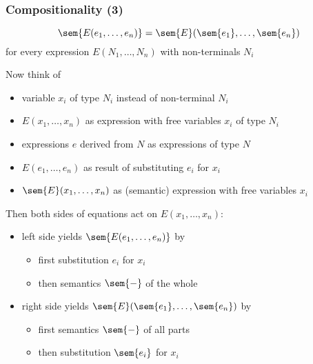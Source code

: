 \begin{frame}\frametitle{Compositionality (3)}
\[\sem{E(e_1,\ldots,e_n)}=\sem{E}(\sem{e_1},\ldots,\sem{e_n})\]
for every expression $E(N_1,\ldots,N_n)$ with non-terminals $N_i$
\bigskip

Now think of
\begin{itemize}
\item variable $x_i$ of type $N_i$ instead of non-terminal $N_i$
\item $E(x_1,\ldots,x_n)$ as expression with free variables $x_i$ of type $N_i$
\item expressions $e$ derived from $N$ as expressions of type $N$
\item $E(e_1,\ldots,e_n)$ as result of substituting $e_i$ for $x_i$
\item $\sem{E}(x_1,\ldots,x_n)$ as (semantic) expression with free variables $x_i$
\end{itemize}

Then both sides of equations act on $E(x_1,\ldots,x_n)$:
\begin{itemize}
\item left side yields $\sem{E(e_1,\ldots,e_n)}$ by
\begin{itemize}
\item first substitution $e_i$ for $x_i$
\item then semantics $\sem{-}$ of the whole
\end{itemize}
\item right side yields $\sem{E}(\sem{e_1},\ldots,\sem{e_n})$ by
\begin{itemize}
\item first semantics $\sem{-}$ of all parts
\item then substitution $\sem{e_i}$ for $x_i$
\end{itemize}
\end{itemize}
\end{frame}

